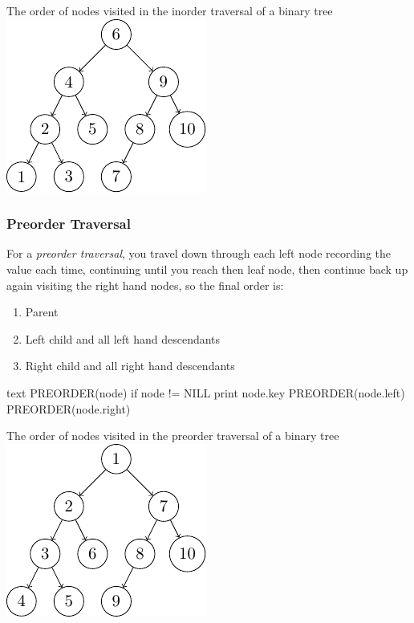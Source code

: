 \begin{highlight}{The order of nodes visited in the inorder traversal of a binary tree}
    \includegraphics{lualatex/pa/8/inordertraversal.pdf}
\end{highlight}

\subsubsection{Preorder Traversal}\label{ssub:preorder_traversal}

For a \emph{preorder traversal}, you travel down through each left node recording the value each time, continuing until you reach then leaf node, then continue back up again visiting the right hand nodes, so the final order is:
\begin{enumerate}
    \item Parent
    \item Left child and all left hand descendants
    \item Right child and all right hand descendants
\end{enumerate}
\begin{code}{text}
    PREORDER(node)
        if node != NILL
            print node.key
            PREORDER(node.left)
            PREORDER(node.right)
\end{code}

\begin{highlight}{The order of nodes visited in the preorder traversal of a binary tree}
    \includegraphics{lualatex/pa/8/preordertraversal.pdf}
\end{highlight}

